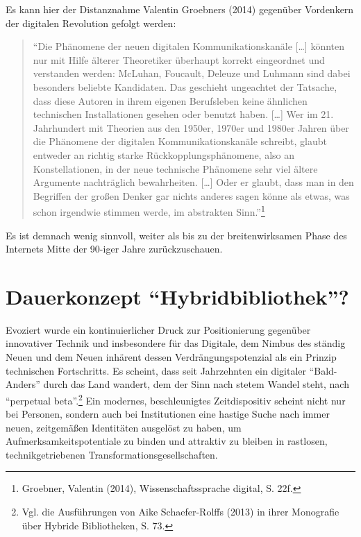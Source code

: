 \documentclass[a4paper,
fontsize=11pt,
oneside,
numbers=noperiodatend,
parskip=half-,
bibliography=totoc,
final
]{scrartcl}
\begin{document}
Es kann hier der Distanznahme Valentin Groebners (2014) gegenüber
Vordenkern der digitalen Revolution gefolgt werden:

\begin{quote}
\enquote{Die Phänomene der neuen digitalen Kommunikationskanäle
{[}\ldots{}{]} könnten nur mit Hilfe älterer Theoretiker überhaupt
korrekt eingeordnet und verstanden werden: McLuhan, Foucault, Deleuze
und Luhmann sind dabei besonders beliebte Kandidaten. Das geschieht
ungeachtet der Tatsache, dass diese Autoren in ihrem eigenen Berufsleben
keine ähnlichen technischen Installationen gesehen oder benutzt haben.
{[}\ldots{}{]} Wer im 21. Jahrhundert mit Theorien aus den 1950er,
1970er und 1980er Jahren über die Phänomene der digitalen
Kommunikationskanäle schreibt, glaubt entweder an richtig starke
Rückkopplungsphänomene, also an Konstellationen, in der neue technische
Phänomene sehr viel ältere Argumente nachträglich bewahrheiten.
{[}\ldots{}{]} Oder er glaubt, dass man in den Begriffen der großen
Denker gar nichts anderes sagen könne als etwas, was schon irgendwie
stimmen werde, im abstrakten Sinn.}\footnote{Groebner, Valentin (2014),
  Wissenschaftssprache digital, S. 22f.}
\end{quote}

Es ist demnach wenig sinnvoll, weiter als bis zu der breitenwirksamen
Phase des Internets Mitte der 90-iger Jahre zurückzuschauen.

\section*{\texorpdfstring{Dauerkonzept
\enquote{Hybridbibliothek}?}{Dauerkonzept Hybridbibliothek?}}\label{dauerkonzept-hybridbibliothek}

Evoziert wurde ein kontinuierlicher Druck zur Positionierung gegenüber
innovativer Technik und insbesondere für das Digitale, dem Nimbus des
ständig Neuen und dem Neuen inhärent dessen Verdrängungspotenzial als
ein Prinzip technischen Fortschritts. Es scheint, dass seit Jahrzehnten
ein digitaler \enquote{Bald-Anders} durch das Land wandert, dem der Sinn
nach stetem Wandel steht, nach \enquote{perpetual beta}.\footnote{Vgl.
  die Ausführungen von Aike Schaefer-Rolffs (2013) in ihrer Monografie
  über Hybride Bibliotheken, S. 73.} Ein modernes, beschleunigtes
Zeitdispositiv scheint nicht nur bei Personen, sondern auch bei
Institutionen eine hastige Suche nach immer neuen, zeitgemäßen
Identitäten ausgelöst zu haben, um Aufmerksamkeitspotentiale zu binden
und attraktiv zu bleiben in rastlosen, technikgetriebenen
Transformationsgesellschaften.
\end{document}
